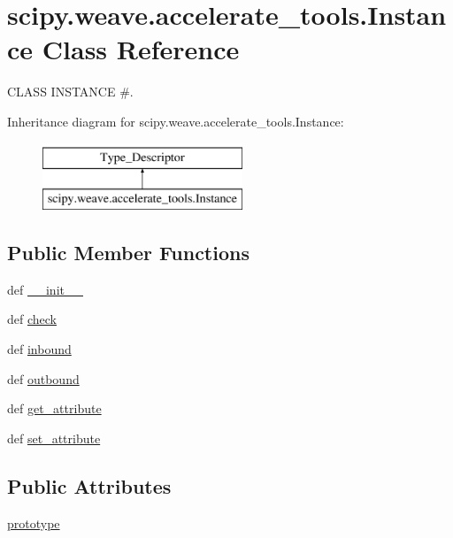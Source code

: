 \hypertarget{classscipy_1_1weave_1_1accelerate__tools_1_1Instance}{}\section{scipy.\+weave.\+accelerate\+\_\+tools.\+Instance Class Reference}
\label{classscipy_1_1weave_1_1accelerate__tools_1_1Instance}


C\+L\+A\+S\+S I\+N\+S\+T\+A\+N\+C\+E \#.  


Inheritance diagram for scipy.\+weave.\+accelerate\+\_\+tools.\+Instance\+:\begin{figure}[H]
\begin{center}
\leavevmode
\includegraphics[height=2.000000cm]{classscipy_1_1weave_1_1accelerate__tools_1_1Instance}
\end{center}
\end{figure}
\subsection*{Public Member Functions}
\begin{DoxyCompactItemize}
\item 
def \hyperlink{classscipy_1_1weave_1_1accelerate__tools_1_1Instance_a591a8d0cb8196827f893894fa00fd915}{\+\_\+\+\_\+init\+\_\+\+\_\+}
\item 
def \hyperlink{classscipy_1_1weave_1_1accelerate__tools_1_1Instance_a689be800efe99776f7a9a1f30045749b}{check}
\item 
def \hyperlink{classscipy_1_1weave_1_1accelerate__tools_1_1Instance_aa113bf09ce1ed56b2bb7101cc1753c85}{inbound}
\item 
def \hyperlink{classscipy_1_1weave_1_1accelerate__tools_1_1Instance_a14020239baca3116dffef888ce311bb2}{outbound}
\item 
def \hyperlink{classscipy_1_1weave_1_1accelerate__tools_1_1Instance_ab77075e0afdae39f01559c2fcbd1c1c5}{get\+\_\+attribute}
\item 
def \hyperlink{classscipy_1_1weave_1_1accelerate__tools_1_1Instance_aeaf80bc4e3edde3235c429dc5db69d09}{set\+\_\+attribute}
\end{DoxyCompactItemize}
\subsection*{Public Attributes}
\begin{DoxyCompactItemize}
\item 
\hyperlink{classscipy_1_1weave_1_1accelerate__tools_1_1Instance_ad2c9ec3f052a52c4da92bc6eee0577f9}{prototype}
\end{DoxyCompactItemize}
